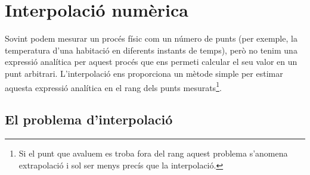 \documentclass[../metodes-numerics.tex]{subfiles}
\begin{document}
\chapter{Interpolació numèrica} %
    Sovint podem mesurar un procés físic com un número de punts (per exemple, la temperatura d'una habitació en diferents instants de temps), però no tenim una expressió analítica per aquest procés que ens permeti calcular el seu valor en un punt arbitrari.
    L'interpolació ens proporciona un mètode simple per estimar aquesta expressió analítica en el rang dels punts mesurats\footnote{Si el punt que avaluem es troba fora del rang aquest problema s'anomena extrapolació i sol ser menys precís que la interpolació.}.
\section{El problema d'interpolació}
\end{document}
